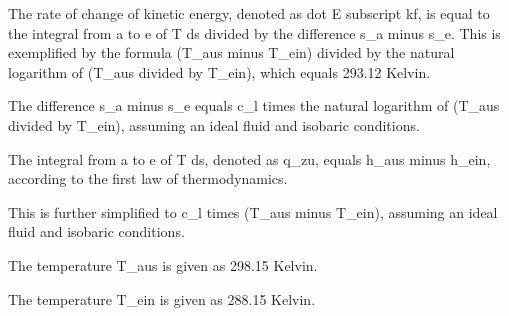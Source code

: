 The rate of change of kinetic energy, denoted as dot E subscript kf, is equal to the integral from a to e of T ds divided by the difference s_a minus s_e. This is exemplified by the formula (T_aus minus T_ein) divided by the natural logarithm of (T_aus divided by T_ein), which equals 293.12 Kelvin.

The difference s_a minus s_e equals c_l times the natural logarithm of (T_aus divided by T_ein), assuming an ideal fluid and isobaric conditions.

The integral from a to e of T ds, denoted as q_zu, equals h_aus minus h_ein, according to the first law of thermodynamics.

This is further simplified to c_l times (T_aus minus T_ein), assuming an ideal fluid and isobaric conditions.

The temperature T_aus is given as 298.15 Kelvin.

The temperature T_ein is given as 288.15 Kelvin.
